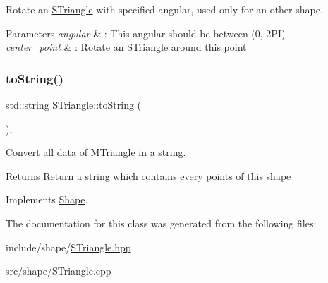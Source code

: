 Rotate an \hyperlink{classSTriangle}{S\+Triangle} with specified angular, used only for an other shape. 


\begin{DoxyParams}{Parameters}
{\em angular} & \+: This angular should be between (0, 2\+PI) \\
\hline
{\em center\+\_\+point} & \+: Rotate an \hyperlink{classSTriangle}{S\+Triangle} around this point \\
\hline
\end{DoxyParams}
\mbox{\label{classSTriangle_a32e4cee65f52d9ee4121c78dc97d86ab}} 
\subsubsection{\texorpdfstring{to\+String()}{toString()}}
{\footnotesize\ttfamily std\+::string S\+Triangle\+::to\+String (\begin{DoxyParamCaption}{ }\end{DoxyParamCaption})\hspace{0.3cm}{\ttfamily [override]}, {\ttfamily [virtual]}}



Convert all data of \hyperlink{classMTriangle}{M\+Triangle} in a string. 

\begin{DoxyReturn}{Returns}
Return a string which contains every points of this shape 
\end{DoxyReturn}


Implements \hyperlink{classShape_a98fa87c6dc4c7045fd6897a8f3bc186c}{Shape}.



The documentation for this class was generated from the following files\+:\begin{DoxyCompactItemize}
\item 
include/shape/\hyperlink{STriangle_8hpp}{S\+Triangle.\+hpp}\item 
src/shape/S\+Triangle.\+cpp\end{DoxyCompactItemize}
